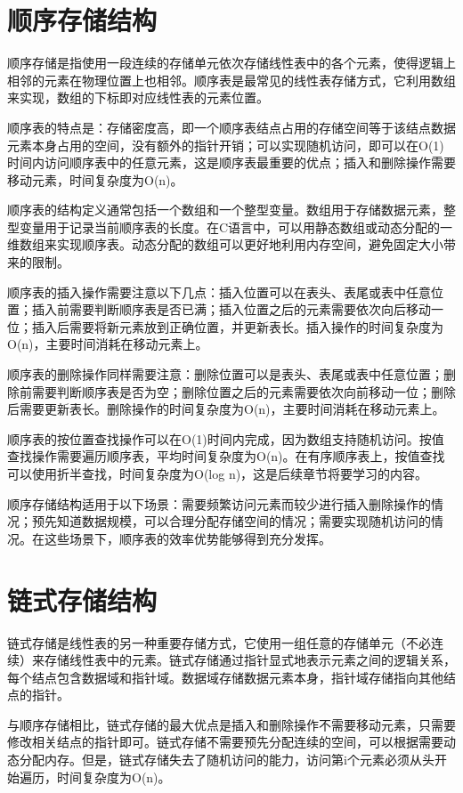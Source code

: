 \documentclass[12pt, a4paper]{article}
\begin{document}
\section{顺序存储结构}

顺序存储是指使用一段连续的存储单元依次存储线性表中的各个元素，使得逻辑上相邻的元素在物理位置上也相邻。顺序表是最常见的线性表存储方式，它利用数组来实现，数组的下标即对应线性表的元素位置。

顺序表的特点是：存储密度高，即一个顺序表结点占用的存储空间等于该结点数据元素本身占用的空间，没有额外的指针开销；可以实现随机访问，即可以在O(1)时间内访问顺序表中的任意元素，这是顺序表最重要的优点；插入和删除操作需要移动元素，时间复杂度为O(n)。

顺序表的结构定义通常包括一个数组和一个整型变量。数组用于存储数据元素，整型变量用于记录当前顺序表的长度。在C语言中，可以用静态数组或动态分配的一维数组来实现顺序表。动态分配的数组可以更好地利用内存空间，避免固定大小带来的限制。

顺序表的插入操作需要注意以下几点：插入位置可以在表头、表尾或表中任意位置；插入前需要判断顺序表是否已满；插入位置之后的元素需要依次向后移动一位；插入后需要将新元素放到正确位置，并更新表长。插入操作的时间复杂度为O(n)，主要时间消耗在移动元素上。

顺序表的删除操作同样需要注意：删除位置可以是表头、表尾或表中任意位置；删除前需要判断顺序表是否为空；删除位置之后的元素需要依次向前移动一位；删除后需要更新表长。删除操作的时间复杂度为O(n)，主要时间消耗在移动元素上。

顺序表的按位置查找操作可以在O(1)时间内完成，因为数组支持随机访问。按值查找操作需要遍历顺序表，平均时间复杂度为O(n)。在有序顺序表上，按值查找可以使用折半查找，时间复杂度为O(log n)，这是后续章节将要学习的内容。

顺序存储结构适用于以下场景：需要频繁访问元素而较少进行插入删除操作的情况；预先知道数据规模，可以合理分配存储空间的情况；需要实现随机访问的情况。在这些场景下，顺序表的效率优势能够得到充分发挥。

\section{链式存储结构}

链式存储是线性表的另一种重要存储方式，它使用一组任意的存储单元（不必连续）来存储线性表中的元素。链式存储通过指针显式地表示元素之间的逻辑关系，每个结点包含数据域和指针域。数据域存储数据元素本身，指针域存储指向其他结点的指针。

与顺序存储相比，链式存储的最大优点是插入和删除操作不需要移动元素，只需要修改相关结点的指针即可。链式存储不需要预先分配连续的空间，可以根据需要动态分配内存。但是，链式存储失去了随机访问的能力，访问第i个元素必须从头开始遍历，时间复杂度为O(n)。
\end{document}
